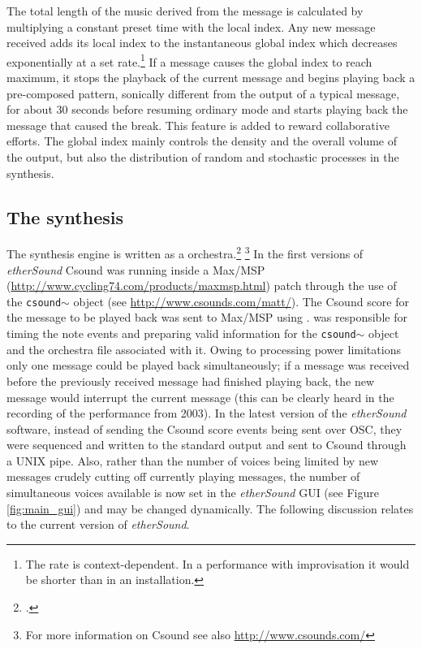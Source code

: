   The total length of the music derived from the message is calculated   by multiplying a constant preset time with the local index. Any new   message received adds its local index to the instantaneous global index which decreases exponentially at a set rate.\footnote{The rate is context-dependent. In a performance with improvisation it would be shorter than in an installation.} If a message causes the global index to reach maximum, it stops the playback of the current   message and begins playing back a pre-composed pattern, sonically   different from the output of a typical message, for about 30 seconds   before resuming ordinary mode and starts playing back the message   that caused the break. This feature is added to reward collaborative   efforts. The global index mainly controls the density and the   overall volume of the output, but also the distribution of random   and stochastic processes in the synthesis. 

\subsection{The synthesis}

The synthesis engine is written as a  orchestra.\footcite{csound} \footnote{For more information on Csound see also \url{http://www.csounds.com/}} In the first versions of \emph{etherSound} Csound was running inside a Max/MSP (\url{http://www.cycling74.com/products/maxmsp.html}) patch through the use of the \texttt{csound$\sim$} object (see \url{http://www.csounds.com/matt/}). The Csound score for the message to be played back was sent to Max/MSP using .  was responsible for timing the note events and preparing valid information for the \texttt{csound$\sim$} object and the orchestra file associated with it. Owing to processing power limitations only one message could be played back simultaneously; if a message was received before the previously received message had finished playing back, the new message would interrupt the current message (this can be clearly heard in the recording of the performance from 2003). In the latest version of the \emph{etherSound} software, instead of sending the Csound score events being sent over OSC, they were sequenced and written to the standard output and sent to Csound through a UNIX pipe. Also, rather than the number of voices being limited by new messages crudely cutting off currently playing messages, the number of simultaneous voices available is now set in the \emph{etherSound} GUI (see Figure \ref{fig:main_gui}) and may be changed dynamically. The following discussion relates to the current version of \emph{etherSound}. 

